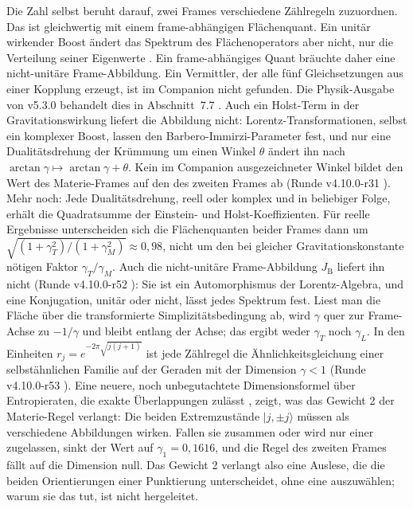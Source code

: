 Die Zahl selbst beruht darauf, zwei Frames verschiedene Zählregeln
zuzuordnen. Das ist gleichwertig mit einem frame-abhängigen Flächenquant.
Ein unitär wirkender Boost ändert das Spektrum des Flächenoperators aber
nicht, nur die Verteilung seiner Eigenwerte \cite{rovelli}. Ein
frame-abhängiges Quant bräuchte daher eine nicht-unitäre Frame-Abbildung.
Ein Vermittler, der alle fünf Gleichsetzungen aus einer Kopplung erzeugt,
ist im Companion nicht gefunden. Die Physik-Ausgabe von v5.3.0 behandelt dies in Abschnitt~7.7 \cite{physics}.
Auch ein Holst-Term in der Gravitationswirkung liefert die Abbildung nicht:
Lorentz-Transformationen, selbst ein komplexer Boost, lassen den
Barbero-Immirzi-Parameter fest, und nur eine Dualitätsdrehung der Krümmung um
einen Winkel \(\theta\) ändert ihn nach \(\arctan\gamma\mapsto\arctan\gamma+\theta\).
Kein im Companion ausgezeichneter Winkel bildet den Wert des Materie-Frames
auf den des zweiten Frames ab (Runde v4.10.0-r31 \cite{holst,layers}). Mehr noch: Jede Dualitätsdrehung,
reell oder komplex und in beliebiger Folge, erhält die Quadratsumme der
Einstein- und Holst-Koeffizienten. Für reelle Ergebnisse unterscheiden sich die
Flächenquanten beider Frames dann um
\(\sqrt{(1+\gamma_T^2)/(1+\gamma_M^2)}\approx0{,}98\), nicht um den bei gleicher
Gravitationskonstante nötigen Faktor \(\gamma_T/\gamma_M\).
Auch die nicht-unitäre Frame-Abbildung \(J_{\mathrm B}\) liefert ihn nicht (Runde v4.10.0-r52 \cite{layers}): Sie ist ein Automorphismus der Lorentz-Algebra, und eine
Konjugation, unitär oder nicht, lässt jedes Spektrum fest. Liest man die Fläche über die transformierte Simplizitätsbedingung ab, wird \(\gamma\)
quer zur Frame-Achse zu \(-1/\gamma\) und bleibt entlang der Achse; das ergibt weder \(\gamma_T\) noch \(\gamma_L\).
In den Einheiten \(r_j=e^{-2\pi\sqrt{j(j+1)}}\) ist jede Zählregel die Ähnlichkeitsgleichung einer selbstähnlichen Familie auf der Geraden mit
der Dimension \(\gamma<1\) (Runde v4.10.0-r53 \cite{layers}). Eine neuere, noch unbegutachtete Dimensionsformel über Entropieraten, die exakte Überlappungen zulässt \cite{openai148}, zeigt, was das
Gewicht 2 der Materie-Regel verlangt: Die beiden Extremzustände \(|j,\pm j\rangle\) müssen als verschiedene Abbildungen wirken. Fallen sie zusammen
oder wird nur einer zugelassen, sinkt der Wert auf \(\gamma_1=0{,}1616\), und die Regel des zweiten Frames fällt auf die Dimension null. Das Gewicht 2
verlangt also eine Auslese, die die beiden Orientierungen einer Punktierung unterscheidet, ohne eine auszuwählen; warum sie das tut, ist nicht
hergeleitet.

